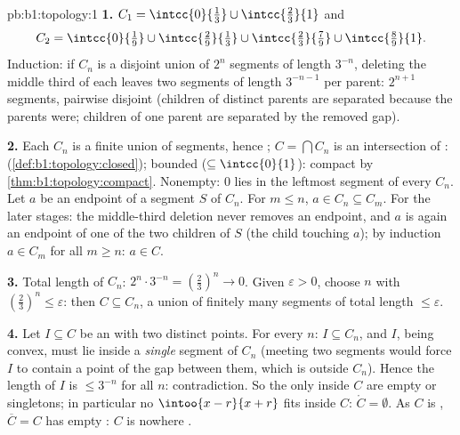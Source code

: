 \begin{solution}{pb:b1:topology:1}
\textbf{1.} $C_1 = \intcc{0}{\frac13} \cup \intcc{\frac23}{1}$
and
\[
C_2 = \intcc{0}{\tfrac19} \cup \intcc{\tfrac29}{\tfrac13}
\cup \intcc{\tfrac23}{\tfrac79} \cup \intcc{\tfrac89}{1} .
\]
Induction: if $C_n$ is a disjoint union of $2^n$  segments
of length $3^{-n}$, deleting the  middle third of each
leaves two  segments of length $3^{-n-1}$ per parent:
$2^{n+1}$ segments, pairwise disjoint (children of distinct
parents are separated because the parents were; children of one
parent are separated by the removed gap).

\textbf{2.} Each $C_n$ is a finite union of segments, hence
; $C = \bigcap C_n$ is an intersection of :
 (\cref{def:b1:topology:closed}); bounded ($\subseteq
\intcc{0}{1}$): compact by \cref{thm:b1:topology:compact}.
Nonempty: $0$ lies in the leftmost segment of every $C_n$. Let
$a$ be an endpoint of a segment $S$ of $C_n$. For $m \leq n$,
$a \in C_n \subseteq C_m$. For the later stages: the middle-third
deletion never removes an endpoint, and $a$ is again an endpoint
of one of the two children of $S$ (the child touching $a$); by
induction $a \in C_m$ for all $m \geq n$: $a \in C$.

\textbf{3.} Total length of $C_n$: $2^n \cdot 3^{-n} =
(\frac23)^n \to 0$. Given $\varepsilon > 0$, choose $n$ with
$(\frac23)^n \leq \varepsilon$: then $C \subseteq C_n$, a union
of finitely many segments of total length $\leq \varepsilon$.

\textbf{4.} Let $I \subseteq C$ be an  with two distinct
points. For every $n$: $I \subseteq C_n$, and $I$, being convex,
must lie inside a \emph{single} segment of $C_n$ (meeting two
segments would force $I$ to contain a point of the gap between
them, which is outside $C_n$). Hence the length of $I$ is $\leq
3^{-n}$ for all $n$: contradiction. So the only 
inside $C$ are empty or singletons; in particular no
$\intoo{x-r}{x+r}$ fits inside $C$: $\mathring C = \emptyset$.
As $C$ is , $\overline C = C$ has empty : $C$ is
nowhere .


\end{solution}
